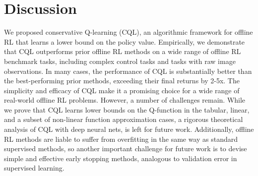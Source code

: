 \documentclass{article}
\begin{document}
\vspace{-0.3cm}






% 


\vspace{-9pt}
\section{Discussion}
\vspace{-9pt}
We proposed conservative Q-learning (CQL), an algorithmic framework for offline RL that learns a lower bound on the policy value.
Empirically, we demonstrate that CQL outperforms prior offline RL methods on a wide range of offline RL benchmark tasks, including complex control tasks and tasks with raw image observations. In many cases, the performance of CQL is substantially better than the best-performing prior methods, exceeding their final returns by 2-5x.
The simplicity and efficacy of CQL make it a promising choice for a wide range of real-world offline RL problems. However, a number of challenges remain. While we prove that CQL learns lower bounds on the Q-function in the tabular, linear, and a subset of non-linear function approximation cases, a rigorous theoretical analysis of CQL with deep neural nets, is left for future work. Additionally, offline RL methods are liable to suffer from overfitting in the same way as standard supervised methods, so another important challenge for future work is to devise simple and effective early stopping methods, analogous to validation error in supervised learning.
\end{document}

